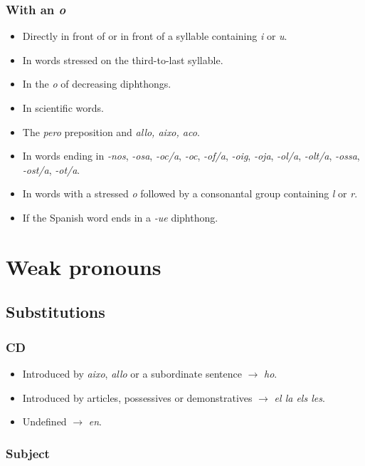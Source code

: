 \documentclass{article}
\begin{document}
\subsubsection*{With an \emph{o}}

\begin{itemize}
    \item Directly in front of or in front of a syllable containing \emph{i} or
    \emph{u}.
    \item In words stressed on the third-to-last syllable.
    \item In the \emph{o} of decreasing diphthongs.
    \item In scientific words.
    \item The \emph{pero} preposition and \emph{allo, aixo, aco}.
    \item In words ending in \emph{-nos}, \emph{-osa}, \emph{-oc/a}, \emph{-oc},
    \emph{-of/a}, \emph{-oig}, \emph{-oja}, \emph{-ol/a}, \emph{-olt/a},
    \emph{-ossa}, \emph{-ost/a}, \emph{-ot/a}.
    \item In words with a stressed \emph{o} followed by a consonantal group
    containing \emph{l} or \emph{r}.
    \item If the Spanish word ends in a \emph{-ue} diphthong.
\end{itemize}

\section*{Weak pronouns}

\subsection*{Substitutions}

\subsubsection*{CD}

\begin{itemize}
    \item Introduced by \emph{aixo}, \emph{allo} or a subordinate sentence
    $\rightarrow$ \emph{ho}.
    \item Introduced by articles, possessives or demonstratives $\rightarrow$
    \emph{el la els les}.
    \item Undefined $\rightarrow$ \emph{en}.
\end{itemize}

\subsubsection*{Subject}
\end{document}
